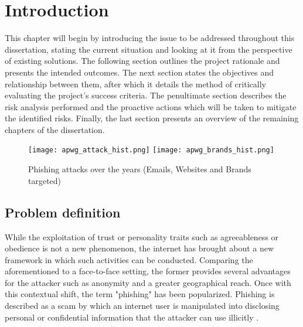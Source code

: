 
\chapter{Introduction}
\label{chap:intro}
This chapter will begin by introducing the issue to be addressed throughout
this dissertation, stating the current situation and looking at it from the
perspective of existing solutions. The following section outlines the project
rationale and presents the intended outcomes. The next section states the
objectives and relationship between them, after which it details the method of
critically evaluating the project's success criteria. The penultimate section
describes the risk analysis performed and the proactive actions which will be
taken to mitigate the identified risks. Finally, the last section presents an
overview of the remaining chapters of the dissertation.

\begin{figure}[b]
	\centering
	\texttt{[image: apwg\_attack\_hist.png]}
	\texttt{[image: apwg\_brands\_hist.png]}
	\caption{Phishing attacks over the years (Emails, Websites and Brands
		targeted)}
	\label{fig:PHISHING_HISTORY}
\end{figure}

\section{Problem definition}
While the exploitation of trust or personality traits such as agreeableness or
obedience is not a new phenomenon, the internet has brought about a new
framework in which such activities can be conducted. Comparing the
aforementioned to a face-to-face setting, the former provides several advantages
for the attacker such as anonymity and a greater geographical reach. Once with
this contextual shift, the term "phishing" has been popularized. Phishing is
described as a scam by which an internet user is manipulated into disclosing
personal or confidential information that the attacker can use illicitly
\citep{MERRIAM_WEBSTER}.

